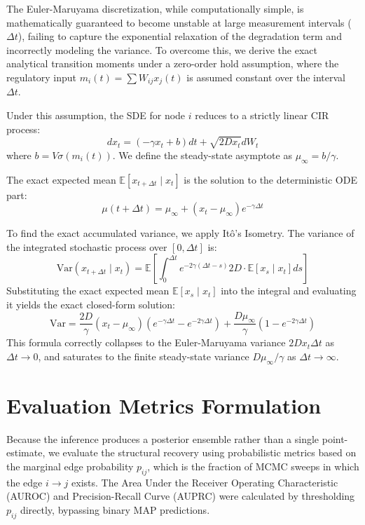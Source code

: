 \documentclass[11pt,onecolumn]{article}
\theoremstyle{definition}
\theoremstyle{remark}
\begin{document}
The Euler-Maruyama discretization, while computationally simple, is mathematically guaranteed to become unstable at large measurement intervals ($\Delta t$), failing to capture the exponential relaxation of the degradation term and incorrectly modeling the variance. To overcome this, we derive the exact analytical transition moments under a zero-order hold assumption, where the regulatory input $m_i(t) = \sum W_{ij} x_j(t)$ is assumed constant over the interval $\Delta t$.

Under this assumption, the SDE for node $i$ reduces to a strictly linear CIR process:
\begin{equation}
    dx_t = (-\gamma x_t + b) dt + \sqrt{2D x_t} dW_t
\end{equation}
where $b = V \sigma(m_i(t))$. We define the steady-state asymptote as $\mu_\infty = b / \gamma$.

The exact expected mean $\mathbb{E}[x_{t+\Delta t} \mid x_t]$ is the solution to the deterministic ODE part:
\begin{equation}
    \mu(t+\Delta t) = \mu_\infty + (x_t - \mu_\infty)e^{-\gamma \Delta t}
\end{equation}

To find the exact accumulated variance, we apply Itô's Isometry. The variance of the integrated stochastic process over $[0, \Delta t]$ is:
\begin{equation}
    \text{Var}(x_{t+\Delta t} \mid x_t) = \mathbb{E}\left[ \int_0^{\Delta t} e^{-2\gamma(\Delta t - s)} 2D \cdot \mathbb{E}[x_s \mid x_t] ds \right]
\end{equation}
Substituting the exact expected mean $\mathbb{E}[x_s \mid x_t]$ into the integral and evaluating it yields the exact closed-form solution:
\begin{equation}
    \text{Var} = \frac{2D}{\gamma} (x_t - \mu_\infty) (e^{-\gamma \Delta t} - e^{-2\gamma \Delta t}) + \frac{D \mu_\infty}{\gamma} (1 - e^{-2\gamma \Delta t})
\end{equation}
This formula correctly collapses to the Euler-Maruyama variance $2D x_t \Delta t$ as $\Delta t \to 0$, and saturates to the finite steady-state variance $D \mu_\infty / \gamma$ as $\Delta t \to \infty$.

\section{Evaluation Metrics Formulation}

Because the inference produces a posterior ensemble rather than a single point-estimate, we evaluate the structural recovery using probabilistic metrics based on the marginal edge probability $p_{ij}$, which is the fraction of MCMC sweeps in which the edge $i \to j$ exists. The Area Under the Receiver Operating Characteristic (AUROC) and Precision-Recall Curve (AUPRC) were calculated by thresholding $p_{ij}$ directly, bypassing binary MAP predictions.
\end{document}
